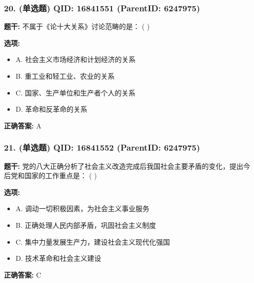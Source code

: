\documentclass[12pt,UTF8]{ctexart}
\begin{document}
\subsubsection*{20. (单选题) \small QID: 16841551 (ParentID: 6247975)}

\textbf{题干:}
不属于《论十大关系》讨论范畴的是： ( )



\textbf{选项:}
\begin{itemize}[leftmargin=*]

  \item A. 社会主义市场经济和计划经济的关系

  \item B. 重工业和轻工业、农业的关系

  \item C. 国家、生产单位和生产者个人的关系

  \item D. 革命和反革命的关系

\end{itemize}

\textbf{正确答案:}
A

\vspace{0.3em}\hrulefill\vspace{0.7em}

\subsubsection*{21. (单选题) \small QID: 16841552 (ParentID: 6247975)}

\textbf{题干:}
党的八大正确分析了社会主义改造完成后我国社会主要矛盾的变化，提出今后党和国家的工作重点是： ( )



\textbf{选项:}
\begin{itemize}[leftmargin=*]

  \item A. 调动一切积极因素，为社会主义事业服务

  \item B. 正确处理人民内部矛盾，巩固社会主义制度

  \item C. 集中力量发展生产力，建设社会主义现代化强国

  \item D. 技术革命和社会主义建设

\end{itemize}

\textbf{正确答案:}
C

\vspace{0.3em}\hrulefill\vspace{0.7em}
\end{document}
